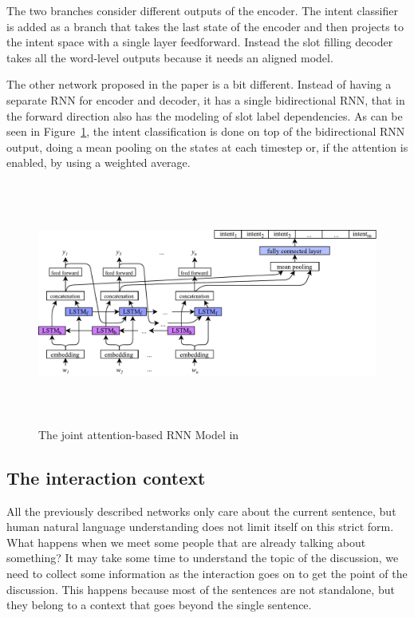 The two branches consider different outputs of the encoder. The intent classifier is added as a branch that takes the last state of the encoder and then projects to the intent space with a single layer feedforward. Instead the slot filling decoder takes all the word-level outputs because it needs an aligned model.

The other network proposed in the paper is a bit different. Instead of having a separate RNN for encoder and decoder, it has a single bidirectional RNN, that in the forward direction also has the modeling of slot label dependencies. As can be seen in Figure~\ref{fig:jointSLUrnn}, the intent classification is done on top of the bidirectional RNN output, doing a mean pooling on the states at each timestep or, if the attention is enabled, by using a weighted average.


\begin{figure}[!htbp]
    \centering
    \includegraphics[max width=\linewidth,max height=8cm,keepaspectratio]{figures/jointSLUrnn}
    \caption{The joint attention-based RNN Model in~\cite{liu2016attention}}\label{fig:jointSLUrnn}
\end{figure}

\subsection{The interaction context}
\label{soaInteractionContext}

All the previously described networks only care about the current sentence, but human natural language understanding does not limit itself on this strict form. What happens when we meet some people that are already talking about something? It may take some time to understand the topic of the discussion, we need to collect some information as the interaction goes on to get the point of the discussion. This happens because most of the sentences are not standalone, but they belong to a context that goes beyond the single sentence.

